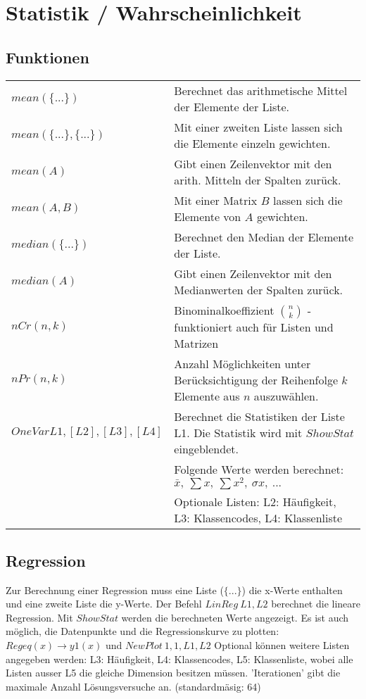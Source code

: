 \section{Statistik / Wahrscheinlichkeit}

\subsection{Funktionen}
\begin{tabular}{|l|l|}
	\hline
	$mean(\{...\})$				& Berechnet das arithmetische Mittel der Elemente der Liste. \\
	$mean(\{...\},\{...\})$		& Mit einer zweiten Liste lassen sich die Elemente einzeln gewichten. \\ \hline
	$mean(A)$					& Gibt einen Zeilenvektor mit den arith. Mitteln der Spalten zurück. \\ 
	$mean(A,B)$					& Mit einer Matrix $B$ lassen sich die Elemente von $A$ gewichten. \\ \hline
	$median(\{...\})$			& Berechnet den Median der Elemente der Liste. \\
	$median(A)$					& Gibt einen Zeilenvektor mit den Medianwerten der Spalten zurück. \\ \hline
	$nCr(n,k)$					& Binominalkoeffizient $\binom{n}{k}$ - funktioniert auch für Listen und Matrizen	\\ \hline
	$nPr(n,k)$					& Anzahl Möglichkeiten unter Berücksichtigung der Reihenfolge $k$ Elemente aus $n$ auszuwählen. \\ \hline
	$OneVar L1,[L2],[L3],[L4]$	& Berechnet die Statistiken der Liste L1. Die Statistik wird mit $ShowStat$ eingeblendet. \\
								& Folgende Werte werden berechnet: $ \bar x, \: \sum x, \: \sum x^2, \: \sigma x, \: ...$ \\
								& Optionale Listen: L2: Häufigkeit, L3: Klassencodes, L4: Klassenliste \\ \hline
\end{tabular}

\subsection{Regression}
Zur Berechnung einer Regression muss eine Liste ($\{...\}$) die x-Werte enthalten 
und eine zweite Liste die y-Werte. Der Befehl $LinReg \: L1,L2$ berechnet die lineare 
Regression. Mit $ShowStat$ werden die berechneten Werte angezeigt. 
Es ist auch möglich, die Datenpunkte und die Regressionskurve zu plotten: 
$Regeq(x) \to y1(x)$ und $NewPlot \: 1,1,L1,L2$ Optional können weitere Listen 
angegeben werden: L3: Häufigkeit, L4: Klassencodes,  L5: Klassenliste, wobei alle Listen ausser 
L5 die gleiche Dimension besitzen müssen. 'Iterationen' gibt die maximale Anzahl Lösungsversuche an. 
(standardmäsig: 64)\\

